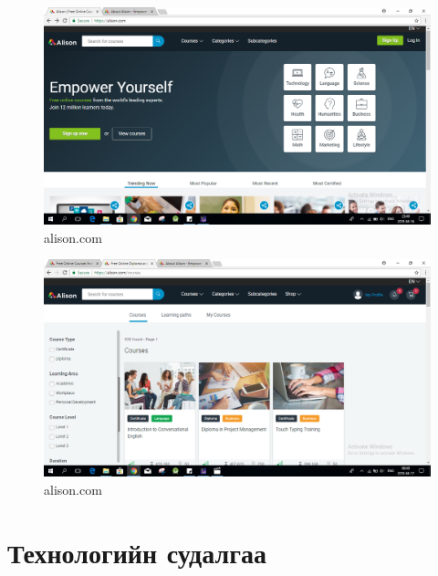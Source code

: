 \begin{figure}[htbp]
	\centering
	\includegraphics[scale=0.4]{Chart/Capture5}
	\caption[Хичээлийн хуудас судалгаа]{alison.com}
	\label{fig:Capture5}
\end{figure}
\begin{figure}[htbp]
	\centering
	\includegraphics[scale=0.4]{Chart/Capture6}
	\caption[Хичээлийн хуудас судалгаа]{alison.com}
	\label{fig:Capture6}
\end{figure}
\newpage
\section{Технологийн судалгаа}

